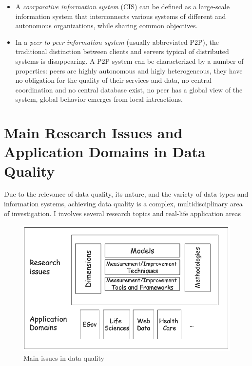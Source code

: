 \begin{itemize}
    \item{A \textit{coorparative information system} (CIS) can be defined as a large-scale information system that interconnects various systems of different and autonomous organizations, 
    while sharing common objectives.}
    \item{In a \textit{peer to peer information system} (usually abbreviated P2P), the traditional distinction between clients and servers typical of distributed systems is disappearing.
    A P2P system can be characterized by a number of properties: peers are highly autonomous and higly heterogeneous, they have no obligation for the quality of their services
    and data, no central coordination and no central database exist, no peer has a global view of the system, global behavior emerges from local intreactions.    
    }
\end{itemize}


\section{Main Research Issues and Application Domains in Data Quality}
Due to the relevance of data quality, its nature, and the variety of data types and information systems, achieving data quality is a complex, multidisciplinary 
area of investigation. I involves several research topics and real-life application areas

\begin{figure}[H]
\centering
\includegraphics[scale=.50]{main-issues-in-dq}
\caption{Main issues in data quality}    
\end{figure}
